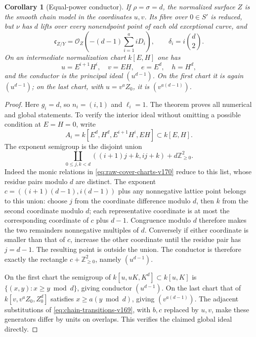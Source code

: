 \documentclass[11pt,reqno]{amsart}
\numberwithin{equation}{section}
\newtheorem{corollary}[theorem]{Corollary}
\theoremstyle{definition}\newtheorem{definition}[theorem]{Definition}
\theoremstyle{remark}\newtheorem{remark}[theorem]{Remark}
\newcommand{\OO}{\mathcal O}\newcommand{\II}{\mathcal I}
\begin{document}
\begin{corollary}[Equal-power conductor]\label{cor:equal-power-v170}
If $\rho=\sigma=d$, the normalized surface $Z$ is the smooth chain
model in the coordinates $u,v$. Its fibre over $0\in S'$ is reduced,
but $\nu$ has $d$ lifts over every nonendpoint point of each old
exceptional curve, and
\[
 \mathfrak c_{Z/Y}=\OO_Z\left(-(d-1)\sum_{i=1}^a iD_i\right),
 \qquad \delta_i=i\binom d2.
\]
On an intermediate normalization chart $k[E,H]$ one has
\[
 u=E^{i+1}H^i,\quad v=EH,\quad e=E^d,\quad h=H^d,
\]
and the conductor is the principal ideal $(u^{d-1})$. On the first
chart it is again $(u^{d-1})$; on the last chart, with
$u=v^a Z_0$, it is $(v^{a(d-1)})$.
\end{corollary}
\begin{proof}
Here $g_i=d$, so $n_i=(i,1)$ and $\ell_i=1$. The theorem proves
all numerical and global statements. To verify the interior ideal
without omitting a possible condition at $E=H=0$, write
\[
 A_i=k[E^d,H^d,E^{i+1}H^i,EH]\subset k[E,H].
\]
The exponent semigroup is the disjoint union
\[
 \coprod_{0\leq j,k<d}
 ((i+1)j+k,ij+k)+d\mathbb Z_{\geq0}^2.
\]
Indeed the monic relations in \eqref{eq:raw-cover-charts-v170}
reduce to this list, whose residue pairs modulo $d$ are distinct.
The exponent $c=((i+1)(d-1),i(d-1))$ plus any nonnegative lattice
point belongs to this union: choose $j$ from the coordinate
difference modulo $d$, then $k$ from the second coordinate modulo
$d$; each representative coordinate is at most the corresponding
coordinate of $c$ plus $d-1$. Congruence modulo $d$ therefore makes
the two remainders nonnegative multiples of $d$. Conversely if either coordinate is smaller than that of $c$,
increase the other coordinate until the residue pair has $j=d-1$.
The resulting point is outside the union. The conductor is therefore
exactly the rectangle $c+\mathbb Z_{\geq0}^2$, namely $(u^{d-1})$.

On the first chart the semigroup of
$k[u,uK,K^d]\subset k[u,K]$ is
$\{(x,y):x\geq y\bmod d\}$, giving conductor $(u^{d-1})$.
On the last chart that of $k[v,v^aZ_0,Z_0^d]$ satisfies
$x\geq a(y\bmod d)$, giving $(v^{a(d-1)})$.
The adjacent substitutions of \eqref{eq:chain-transitions-v169},
with $b,c$ replaced by $u,v$, make these generators differ by units
on overlaps. This verifies the claimed global ideal directly.
\end{proof}
\end{document}
